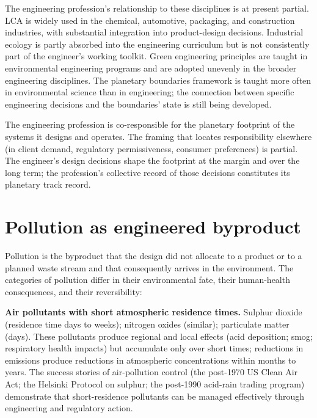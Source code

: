 The engineering profession's relationship to these disciplines is at present partial. LCA is widely used in the chemical, automotive, packaging, and construction industries, with substantial integration into product-design decisions. Industrial ecology is partly absorbed into the engineering curriculum but is not consistently part of the engineer's working toolkit. Green engineering principles are taught in environmental engineering programs and are adopted unevenly in the broader engineering disciplines. The planetary boundaries framework is taught more often in environmental science than in engineering; the connection between specific engineering decisions and the boundaries' state is still being developed.

\begin{principle}
The engineering profession is co-responsible for the planetary footprint of the systems it designs and operates. The framing that locates responsibility elsewhere (in client demand, regulatory permissiveness, consumer preferences) is partial. The engineer's design decisions shape the footprint at the margin and over the long term; the profession's collective record of those decisions constitutes its planetary track record.
\end{principle}

\section{Pollution as engineered byproduct}

Pollution is the byproduct that the design did not allocate to a product or to a planned waste stream and that consequently arrives in the environment. The categories of pollution differ in their environmental fate, their human-health consequences, and their reversibility:

\textbf{Air pollutants with short atmospheric residence times.} Sulphur dioxide (residence time days to weeks); nitrogen oxides (similar); particulate matter (days). These pollutants produce regional and local effects (acid deposition; smog; respiratory health impacts) but accumulate only over short times; reductions in emissions produce reductions in atmospheric concentrations within months to years. The success stories of air-pollution control (the post-1970 US Clean Air Act; the Helsinki Protocol on sulphur; the post-1990 acid-rain trading program) demonstrate that short-residence pollutants can be managed effectively through engineering and regulatory action.

